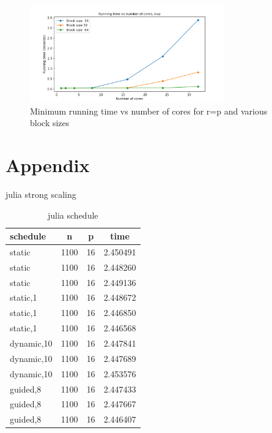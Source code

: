 \documentclass[a4paper,%
7pt,%
DIV12,
headsepline,%
headings=normal,
]{scrartcl}
\begin{document}
\begin{figure}[htbp]
    \centering
    \includegraphics[width=0.75\textwidth]{./assets/weak_scaling_plot.png}
    \caption{Minimum running time vs number of cores for r=p and various block sizes}
    \label{fig:weak_scaling_plot}
\end{figure}

\newpage

\section{Appendix}

\begin{table}[htbp]
\centering
{}
\caption{julia strong scaling}
\label{tab:anotherlabel}
\end{table}

\begin{table}[htbp]
    \centering
    \begin{tabular}{|l|c|c|c|}
        \hline
        schedule & n & p & time \\
        \hline
        static & 1100 & 16 & 2.450491 \\
        static & 1100 & 16 & 2.448260 \\
        static & 1100 & 16 & 2.449136 \\
        static,1 & 1100 & 16 & 2.448672 \\
        static,1 & 1100 & 16 & 2.446850 \\
        static,1 & 1100 & 16 & 2.446568 \\
        dynamic,10 & 1100 & 16 & 2.447841 \\
        dynamic,10 & 1100 & 16 & 2.447689 \\
        dynamic,10 & 1100 & 16 & 2.453576 \\
        guided,8 & 1100 & 16 & 2.447433 \\
        guided,8 & 1100 & 16 & 2.447667 \\
        guided,8 & 1100 & 16 & 2.446407 \\
        \hline
    \end{tabular}
    \caption{julia schedule}
\end{table}
\end{document}
